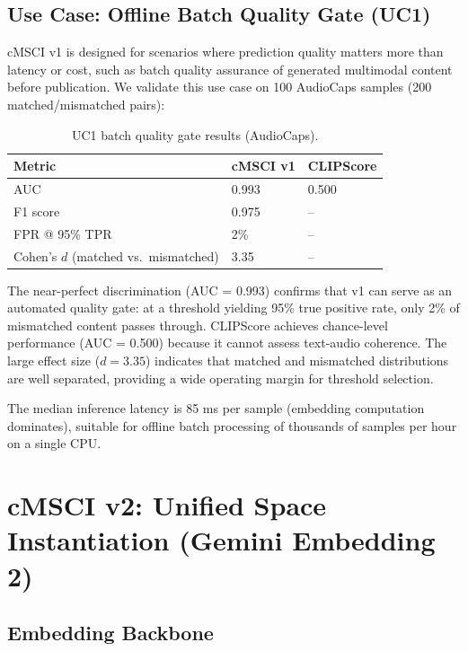 \documentclass[a4paper,fleqn]{cas-sc}
\begin{document}
\begin{itemize}
\subsection{Use Case: Offline Batch Quality Gate (UC1)}\label{sec:uc1}

cMSCI v1 is designed for scenarios where prediction quality matters more than latency or cost, such as batch quality assurance of generated multimodal content before publication. We validate this use case on 100 AudioCaps samples (200 matched/mismatched pairs):

\begin{table}[t]
\caption{UC1 batch quality gate results (AudioCaps).}\label{tab:uc1}
\centering
\begin{tabular}{lll}
\toprule
Metric & cMSCI v1 & CLIPScore \\
\midrule
AUC & 0.993 & 0.500 \\
F1 score & 0.975 & -- \\
FPR @ 95\% TPR & 2\% & -- \\
Cohen's $d$ (matched vs.\ mismatched) & 3.35 & -- \\
\bottomrule
\end{tabular}
\end{table}

The near-perfect discrimination (AUC = 0.993) confirms that v1 can serve as an automated quality gate: at a threshold yielding 95\% true positive rate, only 2\% of mismatched content passes through. CLIPScore achieves chance-level performance (AUC = 0.500) because it cannot assess text-audio coherence. The large effect size ($d = 3.35$) indicates that matched and mismatched distributions are well separated, providing a wide operating margin for threshold selection.

The median inference latency is 85 ms per sample (embedding computation dominates), suitable for offline batch processing of thousands of samples per hour on a single CPU.

\section{cMSCI v2: Unified Space Instantiation (Gemini Embedding 2)}\label{sec:v2}

\subsection{Embedding Backbone}\label{sec:v2-backbone}


\end{itemize}
\end{document}
